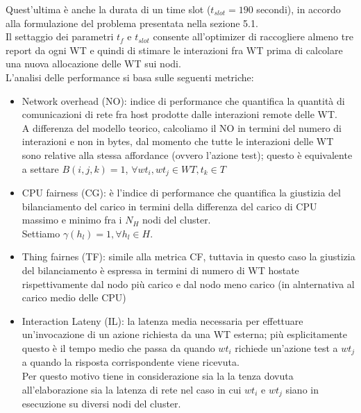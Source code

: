 \documentclass[11pt]{article}
\begin{document}
	Quest'ultima è anche la durata di un time slot ($t_{slot} = 190$ secondi), in accordo alla formulazione del problema presentata nella sezione 5.1.\\
	Il settaggio dei parametri $t_f$ e $t_{slot}$ consente all'optimizer di raccogliere almeno tre report da ogni WT e quindi di stimare le interazioni fra WT prima di calcolare una nuova allocazione delle  WT sui nodi. \\
	L'analisi delle performance si basa sulle seguenti metriche:
	\begin{itemize}
		\item Network overhead (NO): indice di performance che quantifica la quantità di comunicazioni di rete fra host prodotte dalle interazioni remote delle WT. \\
		A differenza del modello teorico, calcoliamo il NO in termini del numero di interazioni e non in bytes, dal momento che tutte le interazioni delle WT sono relative alla stessa affordance (ovvero l'azione test);
		questo è equivalente a settare $B(i,j,k) = 1$, $\forall wt_i, wt_j \in WT, t_k \in T$
		\item CPU fairness (CG): è l'indice di performance che quantifica la giustizia del bilanciamento del carico in termini della differenza del carico di CPU massimo e minimo fra i $N_H$ nodi del cluster. \\
		Settiamo $\gamma(h_l) = 1, \forall h_l \in H$.
		\item Thing fairnes (TF): simile alla metrica CF, tuttavia in questo caso la giustizia del bilanciamento è espressa in termini di numero di WT hostate rispettivamente dal nodo più carico e dal nodo meno carico (in alnternativa al carico medio delle CPU)
		\item Interaction Lateny (IL): la latenza media necessaria per effettuare un'invocazione di un azione richiesta da una WT esterna; più esplicitamente questo è il tempo medio che passa da quando $wt_i$ richiede un'azione test a $wt_j$ a quando la risposta corrispondente viene ricevuta. \\
		Per questo motivo tiene in considerazione sia la la tenza dovuta all'elaborazione sia la latenza di rete nel caso in cui $wt_i$ e $wt_j$ siano in esecuzione su diversi nodi del cluster. \\
	\end{itemize}
\end{document}
